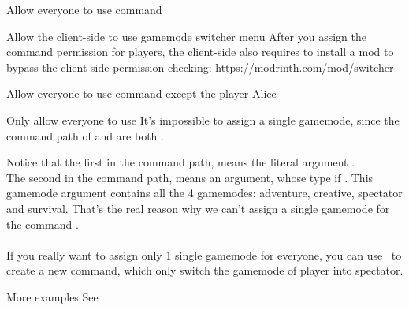 \begin{example}{Allow everyone to use  command}

    \begin{tips}{Allow the client-side to use gamemode switcher menu}
        After you assign the  command permission for players, the client-side also requires to install a mod to bypass the client-side permission checking: \url{https://modrinth.com/mod/switcher}
    \end{tips}
\end{example}

\begin{example}{Allow everyone to use  command except the player Alice}
    \\
\end{example}

\begin{example}{Only allow everyone to use }
    It's impossible to assign a single gamemode, since the command path of  and  are both .

    Notice that the first  in the command path, means the literal argument .\\
    The second  in the command path, means an argument, whose type if .
    This gamemode argument contains all the 4 gamemodes: adventure, creative, spectator and survival.
    That's the real reason why we can't assign a single gamemode for the command .\\\\
    If you really want to assign only 1 single gamemode for everyone, you can use~ to create a new command, which only switch the gamemode of player into spectator.

\end{example}

\begin{example}{More examples}
    See~
\end{example}

